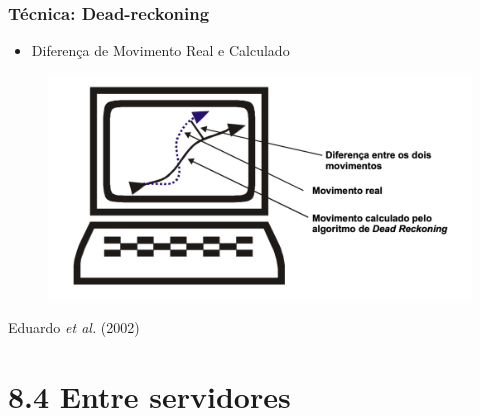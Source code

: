 \documentclass{beamer}
\begin{document}
\begin{frame}
  \frametitle{Técnica: Dead-reckoning}
  \begin{itemize}
    \item Diferença de Movimento Real e Calculado
  \end{itemize}
  \begin{figure}[h]
    \centering
    \vspace{-18pt}
    \includegraphics[width=1.03\textwidth]{imagem_DeadreckoningDiferenca.png}
    \vspace{-20pt}
  \end{figure}
  \begin{flushright}
    \scriptsize
    Eduardo \textit{et al.} (2002)
  \end{flushright}
\end{frame}


\section{8.4 Entre servidores}
\end{document}
